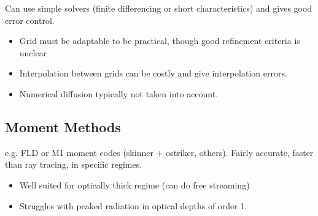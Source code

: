 Can use simple solvers (finite differencing or short characteristics) and gives good error control.

\begin{itemize}
\item Grid must be adaptable to be practical, though good refinement criteria is unclear
\item Interpolation between grids can be costly and give interpolation errors.
\item Numerical diffusion typically not taken into account.
\end{itemize}


\subsection{Moment Methods}
\label{sec:momentmethods}

e.g. FLD or M1 moment codes (skinner + ostriker, others). Fairly accurate, faster than ray tracing, in specific regimes.

\begin{itemize}
\item Well suited for optically thick regime (can do free streaming)
\item Struggles with peaked radiation in optical depths of order 1.
\end{itemize}


